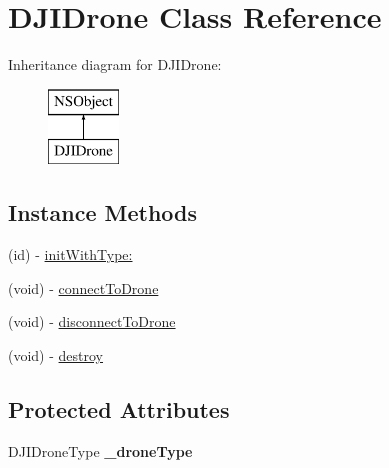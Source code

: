 \hypertarget{interface_d_j_i_drone}{\section{D\+J\+I\+Drone Class Reference}
\label{interface_d_j_i_drone}
}
Inheritance diagram for D\+J\+I\+Drone\+:\begin{figure}[H]
\begin{center}
\leavevmode
\includegraphics[height=2.000000cm]{interface_d_j_i_drone}
\end{center}
\end{figure}
\subsection*{Instance Methods}
\begin{DoxyCompactItemize}
\item 
(id) -\/ \hyperlink{interface_d_j_i_drone_ad6afee4fa10687223ffdfabb3a96cc76}{init\+With\+Type\+:}
\item 
(void) -\/ \hyperlink{interface_d_j_i_drone_a7f2da8feee3a5a339140856402786e4c}{connect\+To\+Drone}
\item 
(void) -\/ \hyperlink{interface_d_j_i_drone_acf84bad64f001cda75b6fec209e6d504}{disconnect\+To\+Drone}
\item 
(void) -\/ \hyperlink{interface_d_j_i_drone_aa1b8f8b9c4bb3dffb49979285f578696}{destroy}
\end{DoxyCompactItemize}
\subsection*{Protected Attributes}
\begin{DoxyCompactItemize}
\item 
\hypertarget{interface_d_j_i_drone_a12680c7d92b2f6ce84934db2795d0dc2}{D\+J\+I\+Drone\+Type {\bfseries \+\_\+drone\+Type}}\label{interface_d_j_i_drone_a12680c7d92b2f6ce84934db2795d0dc2}

\end{DoxyCompactItemize}
